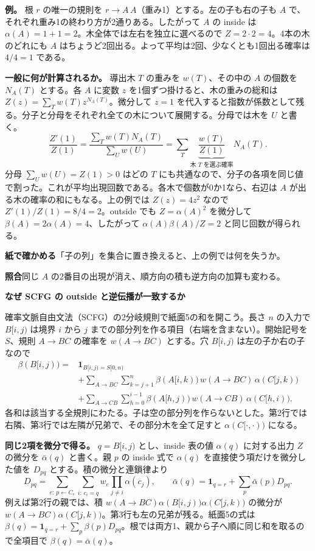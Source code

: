 \documentclass[a5paper,10pt]{ltjsarticle}
\newcommand{\unit}[2]{\clearpage{\small 動画①　#1}\par{\Large\bfseries #2}\par\medskip}
\newcommand{\task}[1]{\par\medskip\textbf{紙で確かめる}\quad #1}
\newcommand{\ans}[1]{\par\textbf{照合}\quad #1}
\begin{document}
\textbf{例。} 根 $r$ の唯一の規則を $r\to A\,A$（重み1）とする。左の子も右の子も $A$ で、それぞれ重み1の終わり方が2通りある。したがって $A$ の inside は $\alpha(A)=1+1=2$。木全体では左右を独立に選べるので $Z=2\cdot2=4$。4本の木のどれにも $A$ はちょうど2回出る。よって平均は2回、少なくとも1回出る確率は $4/4=1$ である。

\textbf{一般に何が計算されるか。} 導出木 $T$ の重みを $w(T)$、その中の $A$ の個数を $N_A(T)$ とする。各 $A$ に変数 $z$ を1個ずつ掛けると、木の重みの総和は $Z(z)=\sum_T w(T)z^{N_A(T)}$。微分して $z=1$ を代入すると指数が係数として残る。分子と分母をそれぞれ全ての木について展開する。分母では木を $U$ と書く。
\[
\frac{Z'(1)}{Z(1)}=\frac{\sum_T w(T)N_A(T)}{\sum_U w(U)}=\sum_T \underbrace{\frac{w(T)}{Z(1)}}_{\text{木 $T$ を選ぶ確率}}N_A(T).
\]
分母 $\sum_U w(U)=Z(1)>0$ はどの $T$ にも共通なので、分子の各項を同じ値で割った。これが平均出現回数である。各木で個数が0か1なら、右辺は $A$ が出る木の確率の和にもなる。上の例では $Z(z)=4z^2$ なので $Z'(1)/Z(1)=8/4=2$。outside でも $Z=\alpha(A)^2$ を微分して $\beta(A)=2\alpha(A)=4$、したがって $\alpha(A)\beta(A)/Z=2$ と同じ回数が得られる。
\task{「子の列」を集合に置き換えると、上の例では何を失うか。}\ans{同じ $A$ の2番目の出現が消え、順方向の積も逆方向の加算も変わる。}
\unit{24:33}{なぜ SCFG の outside と逆伝播が一致するか}
確率文脈自由文法（SCFG）の2分岐規則で紙面5の和を開こう。長さ $n$ の入力で $B[i,j)$ は境界 $i$ から $j$ までの部分列を作る項目（右端を含まない）。開始記号を $S$、規則 $A\to BC$ の確率を $w(A\to BC)$ とする。穴 $B[i,j)$ は左の子か右の子なので
\begin{align*}
\beta(B[i,j))={}&\mathbf{1}_{B[i,j)=S[0,n)}\\
&+\sum_{A\to BC}\sum_{k=j+1}^{n}\beta(A[i,k))\,w(A\to BC)\,\alpha(C[j,k))\\
&+\sum_{A\to CB}\sum_{h=0}^{i-1}\beta(A[h,j))\,w(A\to CB)\,\alpha(C[h,i)).
\end{align*}
各和は該当する全規則にわたる。子は空の部分列を作らないとした。第2行では右隣、第3行では左隣が兄弟で、その部分木を全て足すと $\alpha(C[\cdot,\cdot))$ になる。

\textbf{同じ2項を微分で得る。} $q=B[i,j)$ とし、inside 表の値 $\alpha(q)$ に対する出力 $Z$ の微分を $\bar\alpha(q)$ と書く。親 $p$ の inside 式で $\alpha(q)$ を直接使う項だけを微分した値を $D_{pq}$ とする。積の微分と連鎖律より
\[
D_{pq}=\sum_{e:\,p\leftarrow C_e}\sum_{i:\,c_i=q}w_e\prod_{j\ne i}\alpha(c_j),
\qquad
\bar\alpha(q)=\mathbf{1}_{q=r}+\sum_p\bar\alpha(p)D_{pq}.
\]
例えば第2行の親では、積 $w(A\to BC)\alpha(B[i,j))\alpha(C[j,k))$ の微分が $w(A\to BC)\alpha(C[j,k))$。第3行も左の兄弟が残る。紙面5の式は $\beta(q)=\mathbf{1}_{q=r}+\sum_p\beta(p)D_{pq}$。根では両方1、親から子へ順に同じ和を取るので全項目で $\boxed{\beta(q)=\bar\alpha(q)}$。
\end{document}
